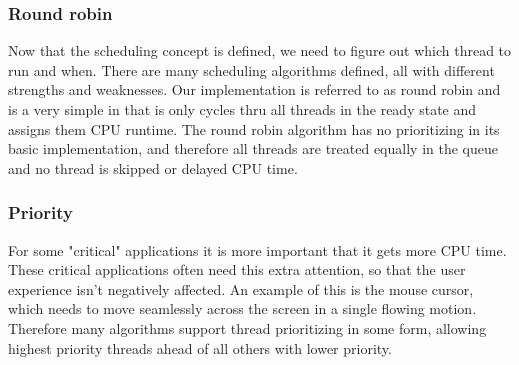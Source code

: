 \subsubsection{Round robin}
Now that the scheduling concept is defined, we need to figure out which thread to run and when. There are many scheduling algorithms defined, all with different strengths and weaknesses. Our implementation is referred to as round robin and is a very simple in that is only cycles thru all threads in the ready state and assigns them CPU runtime. The round robin algorithm has no prioritizing in its basic implementation, and therefore all threads are treated equally in the queue and no thread is skipped or delayed CPU time.

\subsubsection{Priority}
For some "critical" applications it is more important that it gets more CPU time. These critical applications often need this extra attention, so that the user experience isn't negatively affected. An example of this is the mouse cursor, which needs to move seamlessly across the screen in a single flowing motion. Therefore many algorithms support thread prioritizing in some form, allowing highest priority threads ahead of all others with lower priority.

